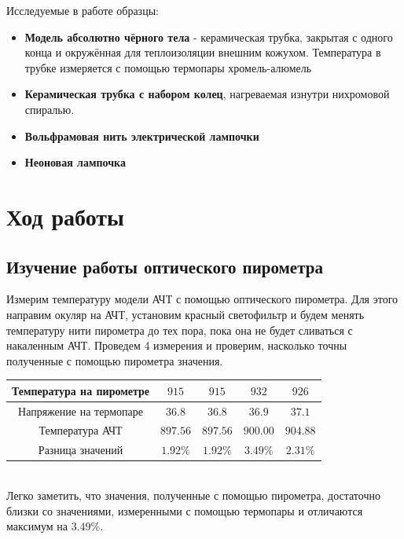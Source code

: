 \documentclass[12pt]{article}
\begin{document}
    Исследуемые в работе образцы:
    \begin{itemize}
        \item \textbf{Модель абсолютно чёрного тела} - керамическая трубка,
        закрытая с одного конца и окружённая для теплоизоляции внешним кожухом.
        Температура в трубке измеряется с помощью термопары хромель-алюмель
        \item \textbf{Керамическая трубка с набором колец}, нагреваемая изнутри
        нихромовой спиралью.
        \item \textbf{Вольфрамовая нить электрической лампочки}
        \item \textbf{Неоновая лампочка}
    \end{itemize}

  \newpage
  \section{Ход работы}

    \subsection{Изучение работы оптического пирометра}

      Измерим температуру модели АЧТ с помощью оптического пирометра. Для этого
      направим окуляр на АЧТ, установим красный светофильтр и будем менять
      температуру нити пирометра до тех пора, пока она не будет сливаться с
      накаленным АЧТ. Проведем 4 измерения и проверим, насколько точны
      полученные с помощью пирометра значения.\\

      \begin{tabular}{ || c || c | c | c | c || }
        \hline
        Температура на пирометре & $915$ & $915$ & $932$ & $926$ \\ \hline
        Напряжение на термопаре & $36.8$ & $36.8$ & $36.9$ & $37.1$ \\ \hline
        Температура АЧТ & $897.56$ & $897.56$ & $900.00$ & $904.88$ \\ \hline
        Разница значений & $1.92 \%$ & $1.92 \%$ & $3.49 \%$ & $2.31 \%$ \\
        \hline
      \end{tabular}\\

      Легко заметить, что значения, полученные с помощью пирометра, достаточно
      близки со значениями, измеренными с помощью термопары и отличаются
      максимум на $3.49 \%$.
\end{document}
